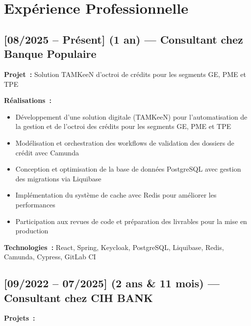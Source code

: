 \section*{Expérience Professionnelle}

\subsection*{[08/2025 -- Présent] (1 an) --- Consultant chez Banque Populaire}
\vspace{4pt}
\textbf{Projet~:} Solution TAMKeeN d'octroi de crédits pour les segments GE, PME et TPE

\textbf{Réalisations~:}
\begin{itemize}
    \item Développement d'une solution digitale (TAMKeeN) pour l'automatisation de la gestion et de l'octroi des crédits pour les segments GE, PME et TPE
    \item Modélisation et orchestration des workflows de validation des dossiers de crédit avec Camunda
    \item Conception et optimisation de la base de données PostgreSQL avec gestion des migrations via Liquibase
    \item Implémentation du système de cache avec Redis pour améliorer les performances
    \item Participation aux revues de code et préparation des livrables pour la mise en production
\end{itemize}
\textbf{Technologies~:} React, Spring, Keycloak, PostgreSQL, Liquibase, Redis, Camunda, Cypress, GitLab CI

\subsection*{[09/2022 -- 07/2025] (2 ans \& 11 mois) --- Consultant chez CIH BANK}
\textbf{Projets~:}

